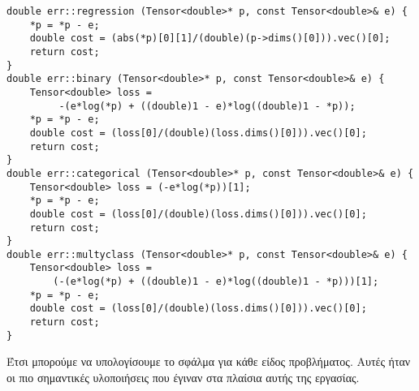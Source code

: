 \begin{otherlanguage}{english}
\begin{lstlisting}[style=cppstyle,caption= Network layer in cpp file, xleftmargin=-1.4cm, xrightmargin=-1.4cm]
double err::regression (Tensor<double>* p, const Tensor<double>& e) {
    *p = *p - e;
    double cost = (abs(*p)[0][1]/(double)(p->dims()[0])).vec()[0];
    return cost;
}
double err::binary (Tensor<double>* p, const Tensor<double>& e) {
    Tensor<double> loss =
         -(e*log(*p) + ((double)1 - e)*log((double)1 - *p));
    *p = *p - e;
    double cost = (loss[0]/(double)(loss.dims()[0])).vec()[0];
    return cost;
}
double err::categorical (Tensor<double>* p, const Tensor<double>& e) {
    Tensor<double> loss = (-e*log(*p))[1];
    *p = *p - e;
    double cost = (loss[0]/(double)(loss.dims()[0])).vec()[0];
    return cost;
}
double err::multyclass (Tensor<double>* p, const Tensor<double>& e) {
    Tensor<double> loss =
        (-(e*log(*p) + ((double)1 - e)*log((double)1 - *p)))[1];
    *p = *p - e;
    double cost = (loss[0]/(double)(loss.dims()[0])).vec()[0];
    return cost;
}
\end{lstlisting}
\end{otherlanguage}
Έτσι μπορούμε να υπολογίσουμε το σφάλμα για κάθε είδος προβλήματος. Αυτές ήταν οι πιο σημαντικές υλοποιήσεις που έγιναν στα πλαίσια αυτής της εργασίας.
